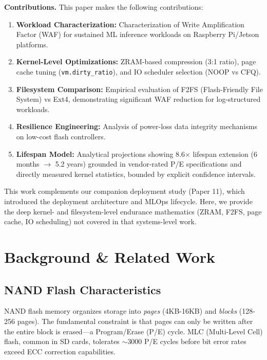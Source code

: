 \documentclass[conference]{IEEEtran}
\begin{document}
\textbf{Contributions.} This paper makes the following contributions:

\begin{enumerate}
    \item \textbf{Workload Characterization:} Characterization of Write Amplification Factor (WAF) for sustained ML inference workloads on Raspberry Pi/Jetson platforms.
    \item \textbf{Kernel-Level Optimizations:} ZRAM-based compression (3:1 ratio), page cache tuning (\texttt{vm.dirty\_ratio}), and IO scheduler selection (NOOP vs CFQ).
    \item \textbf{Filesystem Comparison:} Empirical evaluation of F2FS (Flash-Friendly File System) vs Ext4, demonstrating significant WAF reduction for log-structured workloads.
    \item \textbf{Resilience Engineering:} Analysis of power-loss data integrity mechanisms on low-cost flash controllers.
    \item \textbf{Lifespan Model:} Analytical projections showing 8.6$\times$ lifespan extension (6 months $\to$ 5.2 years) grounded in vendor-rated P/E specifications and directly measured kernel statistics, bounded by explicit confidence intervals.
\end{enumerate}

This work complements our companion deployment study (Paper 11), which introduced the deployment architecture and MLOps lifecycle. Here, we provide the deep kernel- and filesystem-level endurance mathematics (ZRAM, F2FS, page cache, IO scheduling) not covered in that systems-level work.

\section{Background \& Related Work}

\subsection{NAND Flash Characteristics}

NAND flash memory organizes storage into \textit{pages} (4KB-16KB) and \textit{blocks} (128-256 pages). The fundamental constraint is that pages can only be written after the entire block is erased---a Program/Erase (P/E) cycle. MLC (Multi-Level Cell) flash, common in SD cards, tolerates $\sim$3000 P/E cycles before bit error rates exceed ECC correction capabilities. 
\end{document}
